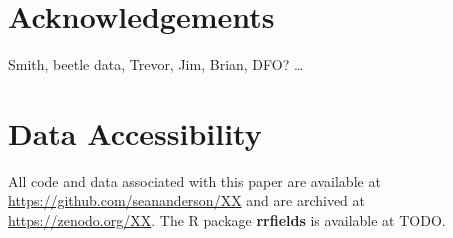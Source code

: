 \documentclass[12pt,english]{article}
\begin{document}
\begin{spacing}{1.9}
%
%

\section{Acknowledgements}

Smith, beetle data, Trevor, Jim, Brian, DFO? \ldots

\section{Data Accessibility}

All code and data associated with this paper are available at
\url{https://github.com/seananderson/XX} and are archived at
\url{https://zenodo.org/XX}.
The R package \textbf{rrfields} is available at TODO.


\end{spacing}
\end{document}
